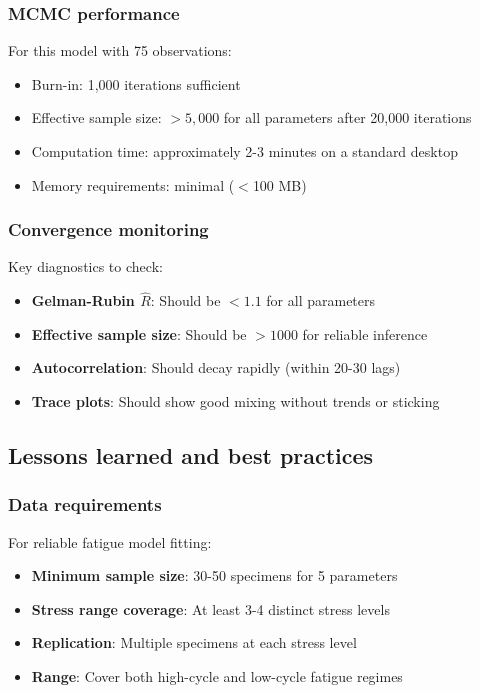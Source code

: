 \subsubsection*{MCMC performance}

For this model with 75 observations:
\begin{itemize}
\item Burn-in: 1,000 iterations sufficient
\item Effective sample size: $>5,000$ for all parameters after 20,000 iterations
\item Computation time: approximately 2-3 minutes on a standard desktop
\item Memory requirements: minimal ($<$100 MB)
\end{itemize}

\subsubsection*{Convergence monitoring}

Key diagnostics to check:
\begin{itemize}
\item \textbf{Gelman-Rubin $\hat{R}$}: Should be $< 1.1$ for all parameters
\item \textbf{Effective sample size}: Should be $> 1000$ for reliable inference
\item \textbf{Autocorrelation}: Should decay rapidly (within 20-30 lags)
\item \textbf{Trace plots}: Should show good mixing without trends or sticking
\end{itemize}

\subsection{Lessons learned and best practices}

\subsubsection*{Data requirements}

For reliable fatigue model fitting:
\begin{itemize}
\item \textbf{Minimum sample size}: 30-50 specimens for 5 parameters
\item \textbf{Stress range coverage}: At least 3-4 distinct stress levels
\item \textbf{Replication}: Multiple specimens at each stress level
\item \textbf{Range}: Cover both high-cycle and low-cycle fatigue regimes
\end{itemize}


